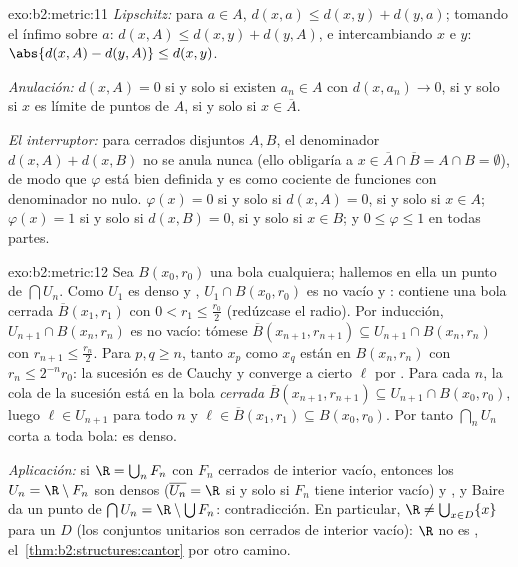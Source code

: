 \begin{solution}{exo:b2:metric:11}
\emph{Lipschitz:} para $a \in A$, $d(x, a) \leq d(x, y) + d(y,
a)$; tomando el ínfimo sobre $a$: $d(x, A) \leq d(x, y) + d(y, A)$,
e intercambiando $x$ e $y$: $\abs{d(x,A) - d(y,A)} \leq d(x,y)$.

\emph{Anulación:} $d(x, A) = 0$ si y solo si existen $a_n \in A$ con
$d(x, a_n) \to 0$, si y solo si $x$ es límite de puntos de $A$, si y
solo si $x \in \overline A$.

\emph{El interruptor:} para cerrados disjuntos $A, B$, el
denominador $d(x,A) + d(x,B)$ no se anula nunca (ello obligaría a $x
\in \overline A \cap \overline B = A \cap B = \emptyset$), de modo
que $\varphi$ está bien definida y es  como cociente de
funciones  con denominador no nulo. $\varphi(x) = 0$ si y
solo si $d(x, A) = 0$, si y solo si $x \in A$; $\varphi(x) = 1$ si y
solo si $d(x, B) = 0$, si y solo si $x \in B$; y $0 \leq \varphi \leq
1$ en todas partes.
\end{solution}

\begin{solution}{exo:b2:metric:12}
Sea $B(x_0, r_0)$ una bola cualquiera; hallemos en ella un punto de
$\bigcap U_n$. Como $U_1$ es denso y , $U_1 \cap B(x_0, r_0)$
es no vacío y : contiene una bola cerrada $\overline
B(x_1, r_1)$ con $0 < r_1 \leq \frac{r_0}2$ (redúzcase el radio).
Por inducción, $U_{n+1} \cap B(x_n, r_n)$ es  no vacío:
tómese $\overline B(x_{n+1}, r_{n+1}) \subseteq U_{n+1} \cap
B(x_n, r_n)$ con $r_{n+1} \leq \frac{r_n}2$. Para $p, q \geq n$,
tanto $x_p$ como $x_q$ están en $B(x_n, r_n)$ con $r_n \leq
2^{-n}r_0$: la sucesión es de Cauchy y converge a cierto $\ell$
por . Para cada $n$, la cola de la sucesión está en la
bola \emph{cerrada} $\overline B(x_{n+1}, r_{n+1}) \subseteq
U_{n+1} \cap B(x_0, r_0)$, luego $\ell \in U_{n+1}$ para todo $n$
y $\ell \in \overline B(x_1, r_1) \subseteq B(x_0, r_0)$. Por
tanto $\bigcap_n U_n$ corta a toda bola: es denso.

\emph{Aplicación:} si $\R = \bigcup_n F_n$ con $F_n$ cerrados de
interior vacío, entonces los $U_n = \R \setminus F_n$ son densos
($\overline{U_n} = \R$ si y solo si $F_n$ tiene interior vacío) y
, y Baire da un punto de $\bigcap U_n = \R \setminus
\bigcup F_n$: contradicción. En particular, $\R \neq \bigcup_{x
\in D} \{x\}$ para un $D$  (los conjuntos unitarios son
cerrados de interior vacío): $\R$ no es , el~\cref{thm:b2:structures:cantor} por otro camino.
\end{solution}

